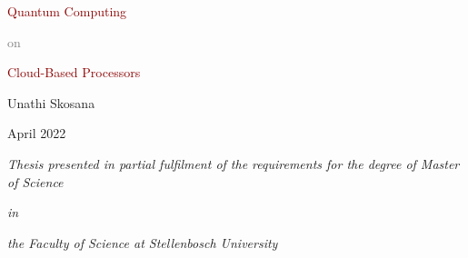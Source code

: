 \thispagestyle{empty}
\begin{minipage}[c]{\textwidth+\marginparsep+\marginparwidth}
    \centering

    \HUGE\textcolor{darkred}{Quantum Computing} \par\textcolor{gray}{on}\par\textcolor{darkred}{Cloud-Based Processors}

    \vspace*{10mm}


    \vspace*{30mm}

    {\huge Unathi Skosana}
    \par
    {\huge April 2022}

    \vspace*{30mm}

    \begin{center}
        \begin{minipage}{0.80\textwidth}
            \centering
            \huge
            \textit{Thesis presented in partial fulfilment of the requirements for the degree of Master of Science}
            \par
            \textit{in} 
            \par
            \textit{the Faculty of Science at Stellenbosch University}
        \end{minipage}
    \end{center}
    \vfill
\end{minipage}
\clearpage

